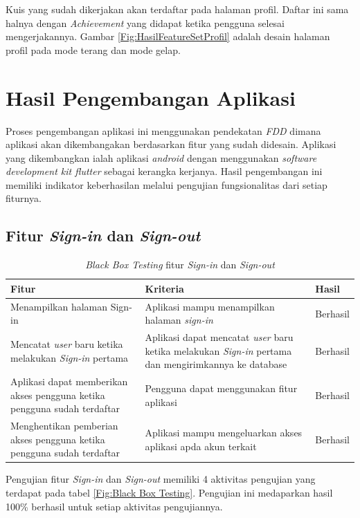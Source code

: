 Kuis yang sudah dikerjakan akan terdaftar pada halaman profil. Daftar ini sama halnya dengan \textit{Achievement} yang didapat ketika pengguna selesai mengerjakannya.
Gambar \ref*{Fig:HasilFeatureSetProfil} adalah desain halaman profil pada mode terang dan mode gelap.
\section{Hasil Pengembangan Aplikasi}
Proses pengembangan aplikasi ini menggunakan pendekatan \textit{FDD} dimana aplikasi akan dikembangakan berdasarkan fitur yang sudah didesain.
Aplikasi yang dikembangkan ialah aplikasi \textit{android} dengan menggunakan \textit{software development kit flutter} sebagai kerangka kerjanya.
Hasil pengembangan ini memiliki indikator keberhasilan melalui pengujian fungsionalitas dari setiap fiturnya.
\subsection{Fitur \textit{Sign-in} dan \textit{Sign-out}}
\begin{table}[H]
	\centering
	\caption{\textit{Black Box Testing} fitur \textit{Sign-in} dan \textit{Sign-out}}
	\label{Tab:blackBoxSign}
	\begin{tabular}{|p{}|p{}|p{}|}
		\hline
		 \centering\textbf{Fitur} & \multicolumn{1}{m{0.45\textwidth}|}{\centering \textbf{Kriteria}}&  \multicolumn{1}{m{0.1\textwidth}|}{\centering \textbf{Hasil}}\\
		\hline
		Menampilkan halaman Sign-in 
		& Aplikasi mampu menampilkan halaman \textit{sign-in} 
		& Berhasil\\
		\hline
		Mencatat \textit{user} baru ketika melakukan \textit{Sign-in} pertama 
		& Aplikasi dapat mencatat \textit{user} baru ketika melakukan \textit{Sign-in} pertama dan mengirimkannya ke database
		& Berhasil\\
		\hline
		Aplikasi dapat memberikan akses pengguna ketika pengguna sudah terdaftar
		& Pengguna dapat menggunakan fitur aplikasi
		& Berhasil\\
		\hline
		Menghentikan pemberian akses pengguna ketika pengguna sudah terdaftar
		& Aplikasi mampu mengeluarkan akses aplikasi apda akun terkait
		& Berhasil\\
		\hline
	\end{tabular}
\end{table}
Pengujian fitur \textit{Sign-in} dan \textit{Sign-out} memiliki 4 aktivitas pengujian yang terdapat pada tabel \ref*{Fig:Black Box Testing}.
Pengujian ini medaparkan hasil 100\% berhasil untuk setiap aktivitas pengujiannya.
